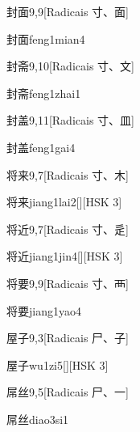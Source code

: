 \begin{entry}{封面}{9,9}[Radicais ⼨、⾯]
  \begin{phonetics}{封面}{feng1mian4}
  \end{phonetics}
\end{entry}

\begin{entry}{封斋}{9,10}[Radicais ⼨、⽂]
  \begin{phonetics}{封斋}{feng1zhai1}
  \end{phonetics}
\end{entry}

\begin{entry}{封盖}{9,11}[Radicais ⼨、⽫]
  \begin{phonetics}{封盖}{feng1gai4}
  \end{phonetics}
\end{entry}

\begin{entry}{将来}{9,7}[Radicais ⼨、⽊]
  \begin{phonetics}{将来}{jiang1lai2}[][HSK 3]
  \end{phonetics}
\end{entry}

\begin{entry}{将近}{9,7}[Radicais ⼨、⾡]
  \begin{phonetics}{将近}{jiang1jin4}[][HSK 3]
  \end{phonetics}
\end{entry}

\begin{entry}{将要}{9,9}[Radicais ⼨、⾑]
  \begin{phonetics}{将要}{jiang1yao4}
  \end{phonetics}
\end{entry}

\begin{entry}{屋子}{9,3}[Radicais ⼫、⼦]
  \begin{phonetics}{屋子}{wu1zi5}[][HSK 3]
  \end{phonetics}
\end{entry}

\begin{entry}{屌丝}{9,5}[Radicais ⼫、⼀]
  \begin{phonetics}{屌丝}{diao3si1}
  \end{phonetics}
\end{entry}

